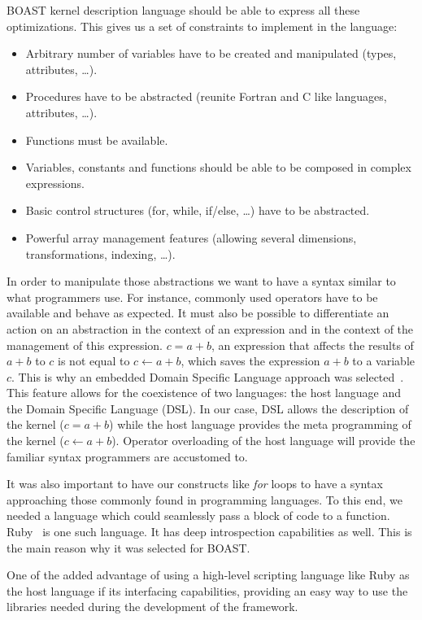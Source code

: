 \documentclass{IEEEtran}
\begin{document}
BOAST kernel description language should be able to express all these
optimizations. This gives us a set of constraints to implement in the language:
\begin{itemize}
\item Arbitrary number of variables have to be created and manipulated (types,
attributes, \ldots).
\item Procedures have to be abstracted (reunite Fortran and C like languages,
attributes, \ldots).
\item Functions must be available.
\item Variables, constants and functions should be able to be composed in
complex expressions.
\item Basic control structures (for, while, if/else, \ldots) have to be abstracted.
\item Powerful array management features (allowing several dimensions, transformations,
indexing, \ldots).
\end{itemize}

In order to manipulate those abstractions we want to have a syntax similar to 
what programmers use. For instance, commonly used operators have to be
available and behave as expected. It must also be possible to differentiate an
action on an abstraction in the context of an expression and in the context of
the management of this expression. $c = a + b$, an expression that affects the
results of $a + b$ to $c$  is not equal to $c \leftarrow a + b$, which saves
the expression $a + b$ to a variable $c$. This is why an embedded Domain
Specific Language approach was selected~\cite{hudak1996building}. This feature
allows for the coexistence of two languages: the host language and the Domain
Specific Language (DSL).  In our case, DSL allows the description of the kernel
($c = a + b$) while the host language provides the meta programming of the
kernel ($c \leftarrow a + b$). Operator overloading of the host language will
provide the familiar syntax programmers are accustomed to.

It was also important to have our constructs like \emph{for} loops to have a
syntax approaching those commonly found in programming languages. To this end,
we needed a language which could seamlessly pass a block of code to a function.
Ruby~\cite{matsumoto2002ruby} is one such language. It has deep introspection
capabilities as well. This is the main reason why it was selected for BOAST.

One of the added advantage of using a high-level scripting language like Ruby
as the host language if its interfacing capabilities, providing an easy way to
use the libraries needed during the development of the framework.
\end{document}
